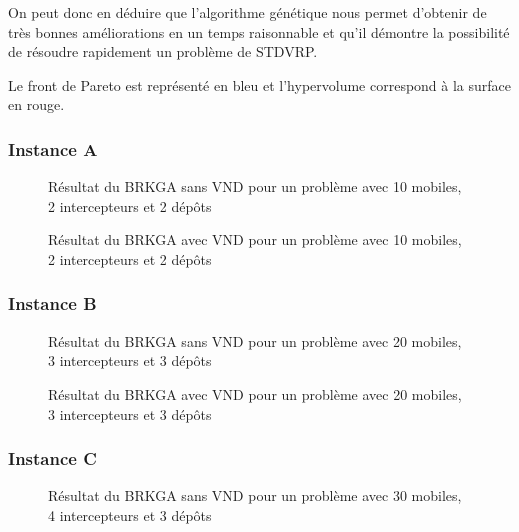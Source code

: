             On peut donc en déduire que l'algorithme génétique nous permet d'obtenir de très bonnes améliorations en un temps raisonnable et qu'il démontre la possibilité de résoudre rapidement un problème de STDVRP.

            Le front de Pareto est représenté en bleu et l'hypervolume correspond à la surface en rouge.
            
            \subsubsection{Instance A}
                
                \begin{figure}[H]
                	
                \caption{Résultat du BRKGA sans VND pour un problème avec 10 mobiles, 2 intercepteurs et 2 dépôts}
				\label{fig:10m2i2d-sansvnd}
				\end{figure}
                
                \begin{figure}[H]
                	
                \caption{Résultat du BRKGA avec VND pour un problème avec 10 mobiles, 2 intercepteurs et 2 dépôts}
				\label{fig:10m2i2d-avecvnd}
				\end{figure}
				
            \subsubsection{Instance B}
                \begin{figure}[H]
                	
                \caption{Résultat du BRKGA sans VND pour un problème avec 20 mobiles, 3 intercepteurs et 3 dépôts}
				\label{fig:20m3i3d-sansvnd}
				\end{figure}
                
                \begin{figure}[H]
                	
                \caption{Résultat du BRKGA avec VND pour un problème avec 20 mobiles, 3 intercepteurs et 3 dépôts}
				\label{fig:20m3i3d-avecvnd}
				\end{figure}
				
            \subsubsection{Instance C}
           		\begin{figure}[H]
                	
                \caption{Résultat du BRKGA sans VND pour un problème avec 30 mobiles, 4 intercepteurs et 3 dépôts}
				\label{fig:30m4i3d-sansvnd}
                \end{figure}
                
